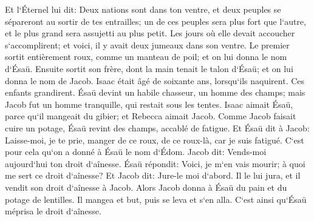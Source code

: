 \verse Et l`Éternel lui dit: Deux nations sont dans ton ventre, et deux peuples se sépareront au sortir de tes entrailles; un de ces peuples sera plus fort que l`autre, et le plus grand sera assujetti au plus petit. 
\verse Les jours où elle devait accoucher s`accomplirent; et voici, il y avait deux jumeaux dans son ventre. 
\verse Le premier sortit entièrement roux, comme un manteau de poil; et on lui donna le nom d`Ésaü. 
\verse Ensuite sortit son frère, dont la main tenait le talon d`Ésaü; et on lui donna le nom de Jacob. Isaac était âgé de soixante ans, lorsqu`ils naquirent. 
\verse Ces enfants grandirent. Ésaü devint un habile chasseur, un homme des champs; mais Jacob fut un homme tranquille, qui restait sous les tentes. 
\verse Isaac aimait Ésaü, parce qu`il mangeait du gibier; et Rebecca aimait Jacob. 
\verse Comme Jacob faisait cuire un potage, Ésaü revint des champs, accablé de fatigue. 
\verse Et Ésaü dit à Jacob: Laisse-moi, je te prie, manger de ce roux, de ce roux-là, car je suis fatigué. C`est pour cela qu`on a donné à Ésaü le nom d`Édom. 
\verse Jacob dit: Vends-moi aujourd`hui ton droit d`aînesse. 
\verse Ésaü répondit: Voici, je m`en vais mourir; à quoi me sert ce droit d`aînesse? 
\verse Et Jacob dit: Jure-le moi d`abord. Il le lui jura, et il vendit son droit d`aînesse à Jacob. 
\verse Alors Jacob donna à Ésaü du pain et du potage de lentilles. Il mangea et but, puis se leva et s`en alla. C`est ainsi qu`Ésaü méprisa le droit d`aînesse. 

\chapter{}

